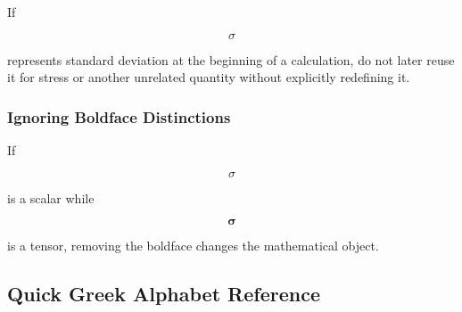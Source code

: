 If

\[
\sigma
\]

represents standard deviation at the beginning of a calculation, do not later
reuse it for stress or another unrelated quantity without explicitly
redefining it.

\subsubsection{Ignoring Boldface Distinctions}

If

\[
\sigma
\]

is a scalar while

\[
\boldsymbol{\sigma}
\]

is a tensor, removing the boldface changes the mathematical object.

\subsection{Quick Greek Alphabet Reference}
\label{subsec:quick-greek-reference}

